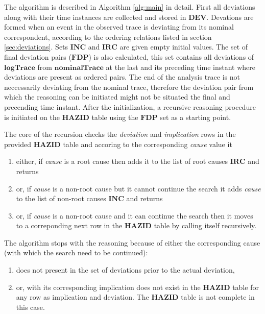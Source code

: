 \documentclass[conference]{IEEEtran}
\begin{document}
The algorithm is described in Algorithm \ref{alg:main} in detail. First all deviations along with their time instances are collected and stored in $\mathbf{DEV}$. Devations are formed when an event in the observed trace is deviating from its nominal correspondent, according to the ordering relations listed in section \ref{sec:deviations}. Sets $\mathbf{INC}$ and $\mathbf{IRC}$ are given empty initial values. The set of final deviation pairs ($\mathbf{FDP}$) is also calculated, this set contains all deviations of $\mathbf{logTrace}$ from $\mathbf{nominalTrace}$ at the last and its preceding time instant where deviations are present as ordered pairs. The end of the analysis trace is not neccessarily deviating from the nominal trace, therefore the deviation pair from which the reasoning can be initiated might not be situated the final and precending time instant. After the initialization, a recursive reasoning procedure is initiated on the $\mathbf{HAZID}$ table using the $\mathbf{FDP}$ set as a starting point.

The core of the recursion checks the \textit{deviation} and \textit{implication} rows in the provided $\mathbf{HAZID}$ table and accoring to the corresponding \textit{cause} value it
\begin{enumerate}
\item either, if \textit{cause} is a root cause then adds it to the list of root causes $\mathbf{IRC}$ and returns
\item or, if \textit{cause} is a non-root cause but it cannot continue the search it adds \textit{cause} to the list of non-root causes $\mathbf{INC}$ and returns
\item or, if \textit{cause} is a non-root cause and it can continue the search then it moves to a correponding next row in the $\mathbf{HAZID}$ table by calling itself recursively.
\end{enumerate}

The algorithm stops with the reasoning because of either the corresponding cause (with which the search need to be continued):
\begin{enumerate}
\item does not present in the set of deviations prior to the actual deviation,
\item or, with its corresponding implication does not exist in the $\mathbf{HAZID}$ table for any row as implication and deviation. The $\mathbf{HAZID}$ table is not complete in this case.
\end{enumerate}
\end{document}
